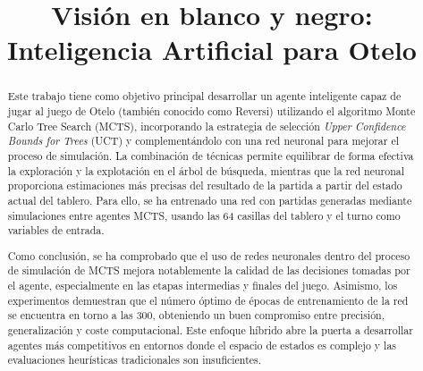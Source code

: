 \documentclass[conference,a4paper]{IEEEtran}
\begin{document}
\title{Visión en blanco y negro: Inteligencia Artificial para Otelo}

\author{

    \and

  
}

\maketitle

\begin{abstract}
Este trabajo tiene como objetivo principal desarrollar un agente inteligente capaz de jugar al juego de Otelo (también conocido como Reversi) utilizando el algoritmo Monte Carlo Tree Search (MCTS), incorporando la estrategia de selección \textit{Upper Confidence Bounds for Trees} (UCT) y complementándolo con una red neuronal para mejorar el proceso de simulación. La combinación de técnicas permite equilibrar de forma efectiva la exploración y la explotación en el árbol de búsqueda, mientras que la red neuronal proporciona estimaciones más precisas del resultado de la partida a partir del estado actual del tablero. Para ello, se ha entrenado una red con partidas generadas mediante simulaciones entre agentes MCTS, usando las 64 casillas del tablero y el turno como variables de entrada.

Como conclusión, se ha comprobado que el uso de redes neuronales dentro del proceso de simulación de MCTS mejora notablemente la calidad de las decisiones tomadas por el agente, especialmente en las etapas intermedias y finales del juego. Asimismo, los experimentos demuestran que el número óptimo de épocas de entrenamiento de la red se encuentra en torno a las 300, obteniendo un buen compromiso entre precisión, generalización y coste computacional. Este enfoque híbrido abre la puerta a desarrollar agentes más competitivos en entornos donde el espacio de estados es complejo y las evaluaciones heurísticas tradicionales son insuficientes.

\end{abstract}
\end{document}
